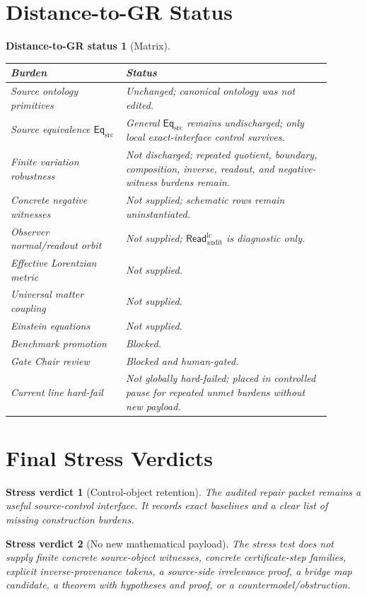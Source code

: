 \documentclass[11pt]{article}
\newcommand{\EqSrc}{\mathsf{Eq}_{\mathrm{src}}}
\newcommand{\ReadAudit}{\mathsf{Read}_{\mathrm{audit}}^{\mathrm{lc}}}
\newtheorem{verdict}{Stress verdict}
\newtheorem{distancestatus}{Distance-to-GR status}
\begin{document}
\section{Distance-to-GR Status}

\begin{distancestatus}[Matrix]
\begin{center}
\small
\begin{tabular}{p{0.32\linewidth}p{0.58\linewidth}}
\hline
Burden & Status \\
\hline
Source ontology primitives & Unchanged; canonical ontology was not edited. \\
Source equivalence \(\EqSrc\) & General \(\EqSrc\) remains undischarged; only local exact-interface control survives. \\
Finite variation robustness & Not discharged; repeated quotient, boundary, composition, inverse, readout, and negative-witness burdens remain. \\
Concrete negative witnesses & Not supplied; schematic rows remain uninstantiated. \\
Observer normal/readout orbit & Not supplied; \(\ReadAudit\) is diagnostic only. \\
Effective Lorentzian metric & Not supplied. \\
Universal matter coupling & Not supplied. \\
Einstein equations & Not supplied. \\
Benchmark promotion & Blocked. \\
Gate Chair review & Blocked and human-gated. \\
Current line hard-fail & Not globally hard-failed; placed in controlled pause for repeated unmet burdens without new payload. \\
\hline
\end{tabular}
\end{center}
\end{distancestatus}

\section{Final Stress Verdicts}

\begin{verdict}[Control-object retention]
The audited repair packet remains a useful source-control interface.
It records exact baselines and a clear list of missing construction
burdens.
\end{verdict}

\begin{verdict}[No new mathematical payload]
The stress test does not supply finite concrete source-object
witnesses, concrete certificate-step families, explicit
inverse-provenance tokens, a source-side irrelevance proof, a bridge
map candidate, a theorem with hypotheses and proof, or a
countermodel/obstruction.
\end{verdict}
\end{document}
